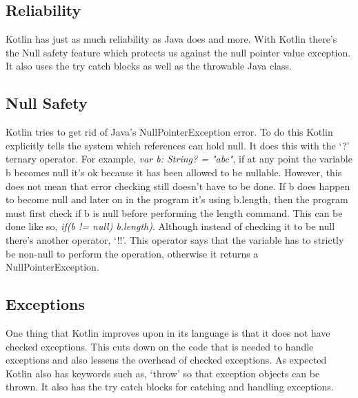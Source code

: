 
\begin{center}
\section{Reliability}
\end{center}

\hspace{1em} Kotlin has just as much reliability as Java does and more. With Kotlin there's the Null safety feature which protects us against the null pointer value exception. It also uses the try catch blocks as well as the throwable Java class. 

\subsection{Null Safety}

\hspace{1em}Kotlin tries to get rid of Java's NullPointerException error. To do this Kotlin explicitly tells the system which references can hold null. It does this with the `?' ternary operator. For example, \textit{var b: String? = "abc"}, if at any point the variable b becomes null it's ok because it has been allowed to be nullable. However, this does not mean that error checking still doesn't have to be done. If b does happen to become null and later on in the program it's using b.length, then the program must first check if b is null before performing the length command. This can be done like so, \textit{if(b != null) b.length)}. Although instead of checking it to be null there's another operator, `!!'. This operator says that the variable has to strictly be non-null to perform the operation, otherwise it returns a NullPointerException.

\subsection{Exceptions}

\hspace{1em} One thing that Kotlin improves upon in its language is that it does not have checked exceptions. This cuts down on the code that is needed to handle exceptions and also lessens the overhead of checked exceptions. As expected Kotlin also has keywords such as, `throw' so that exception objects can be thrown. It also has the try catch blocks for catching and handling exceptions.

